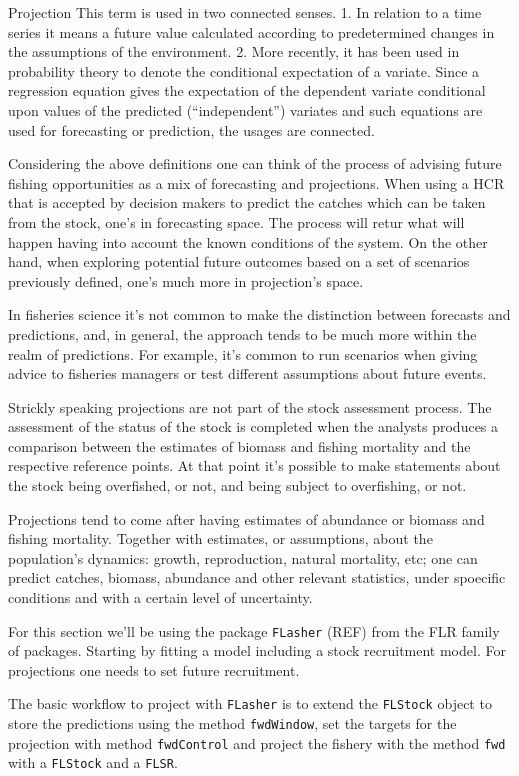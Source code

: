 \documentclass[
]{book}
\begin{document}
Projection
This term is used in two connected senses.
1. In relation to a time series it means a future value calculated according to predetermined changes in the
assumptions of the environment.
2. More recently, it has been used in probability theory to denote the conditional expectation of a variate. Since a regression equation gives the expectation of the dependent variate conditional upon values of the predicted (``independent'') variates and such equations are used for forecasting or prediction, the usages are connected.

Considering the above definitions one can think of the process of advising future fishing opportunities as a mix of forecasting and projections. When using a HCR that is accepted by decision makers to predict the catches which can be taken from the stock, one's in forecasting space. The process will retur what will happen having into account the known conditions of the system. On the other hand, when exploring potential future outcomes based on a set of scenarios previously defined, one's much more in projection's space.

In fisheries science it's not common to make the distinction between forecasts and predictions, and, in general, the approach tends to be much more within the realm of predictions. For example, it's common to run scenarios when giving advice to fisheries managers or test different assumptions about future events.

Strickly speaking projections are not part of the stock assessment process. The assessment of the status of the stock is completed when the analysts produces a comparison between the estimates of biomass and fishing mortality and the respective reference points. At that point it's possible to make statements about the stock being overfished, or not, and being subject to overfishing, or not.

Projections tend to come after having estimates of abundance or biomass and fishing mortality. Together with estimates, or assumptions, about the population's dynamics: growth, reproduction, natural mortality, etc; one can predict catches, biomass, abundance and other relevant statistics, under spoecific conditions and with a certain level of uncertainty.

For this section we'll be using the package \texttt{FLasher} (REF) from the FLR family of packages. Starting by fitting a model including a stock recruitment model. For projections one needs to set future recruitment.

The basic workflow to project with \texttt{FLasher} is to extend the \texttt{FLStock} object to store the predictions using the method \texttt{fwdWindow}, set the targets for the projection with method \texttt{fwdControl} and project the fishery with the method \texttt{fwd} with a \texttt{FLStock} and a \texttt{FLSR}.
\end{document}
